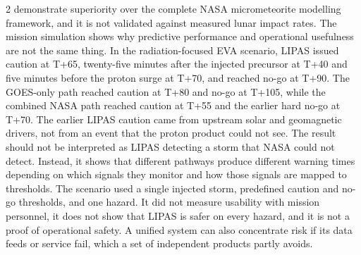 \begin{multicols}{2}
demonstrate superiority over the complete NASA micrometeorite modelling framework, and it is not validated against measured lunar impact rates. The mission simulation shows why predictive performance and operational usefulness are not the same thing. In the radiation-focused EVA scenario, LIPAS issued caution at T+65, twenty-five minutes after the injected precursor at T+40 and five minutes before the proton surge at T+70, and reached no-go at T+90. The GOES-only path reached caution at T+80 and no-go at T+105, while the combined NASA path reached caution at T+55 and the earlier hard no-go at T+70. The earlier LIPAS caution came from upstream solar and geomagnetic drivers, not from an event that the proton product could not see. The result should not be interpreted as LIPAS detecting a storm that NASA could not detect. Instead, it shows that different pathways produce different warning times depending on which signals they monitor and how those signals are mapped to thresholds. The scenario used a single injected storm, predefined caution and no-go thresholds, and one hazard. It did not measure usability with mission personnel, it does not show that LIPAS is safer on every hazard, and it is not a proof of operational safety. A unified system can also concentrate risk if its data feeds or service fail, which a set of independent products partly avoids.


\end{multicols}
